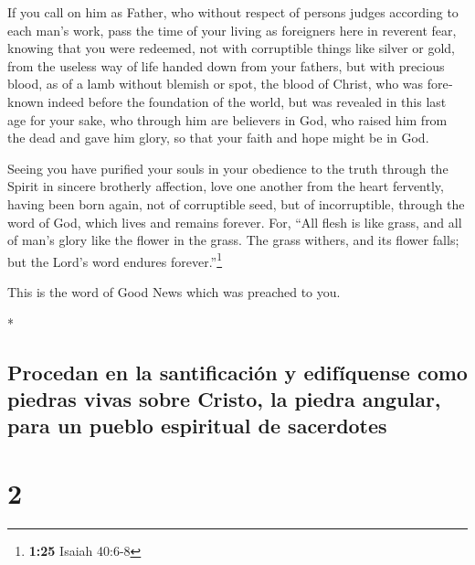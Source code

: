 \begin{paracol}{2}
\begin{otherlanguage}{english}
 If you call on him as Father, who without respect of
persons judges according to each man's work, pass the time of your
living as foreigners here in reverent fear,  knowing that
you were redeemed, not with corruptible things like silver or gold, from
the useless way of life handed down from your fathers, 
but with precious blood, as of a lamb without blemish or spot, the blood
of Christ,  who was foreknown indeed before the
foundation of the world, but was revealed in this last age for your
sake,  who through him are believers in God, who raised
him from the dead and gave him glory, so that your faith and hope might
be in God.

 Seeing you have purified your souls in your obedience to
the truth through the Spirit in sincere brotherly affection, love one
another from the heart fervently,  having been born
again, not of corruptible seed, but of incorruptible, through the word
of God, which lives and remains forever.  For, ``All
flesh is like grass, and all of man's glory like the flower in the
grass. The grass withers, and its flower falls;  but the
Lord's word endures forever.''\footnote{\textbf{1:25} Isaiah 40:6-8}

This is the word of Good News which was preached to you.

\end{otherlanguage}

\switchcolumn[0]*

\hypertarget{procedan-en-la-santificaciuxf3n-y-edifuxedquense-como-piedras-vivas-sobre-cristo-la-piedra-angular-para-un-pueblo-espiritual-de-sacerdotes}{%
\subsection{Procedan en la santificación y edifíquense como piedras
vivas sobre Cristo, la piedra angular, para un pueblo espiritual de
sacerdotes}\label{procedan-en-la-santificaciuxf3n-y-edifuxedquense-como-piedras-vivas-sobre-cristo-la-piedra-angular-para-un-pueblo-espiritual-de-sacerdotes}}

\hypertarget{section-2}{%
\section{2}\label{section-2}}


\end{paracol}
